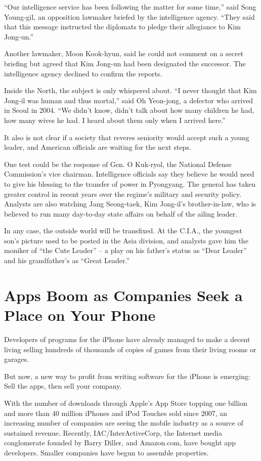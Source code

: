 \documentclass[12pt,a4paper,onecolumn]{article}
\begin{document}
``Our intelligence service has been following the matter for some time,'' said Song Young-gil, an
opposition lawmaker briefed by the intelligence agency. ``They said that this message instructed the
diplomats to pledge their allegiance to Kim Jong-un.''

Another lawmaker, Moon Kook-hyun, said he could not comment on a secret briefing but agreed that Kim
Jong-un had been designated the successor. The intelligence agency declined to confirm the reports.

Inside the North, the subject is only whispered about. ``I never thought that Kim Jong-il was human
and thus mortal,'' said Oh Yeon-jong, a defector who arrived in Seoul in 2004. ``We didn't know,
didn't talk about how many children he had, how many wives he had. I heard about them only when I
arrived here.''

It also is not clear if a society that reveres seniority would accept such a young leader, and
American officials are waiting for the next steps.

One test could be the response of Gen. O Kuk-ryol, the National Defense Commission's vice chairman.
Intelligence officials say they believe he would need to give his blessing to the transfer of power
in Pyongyang. The general has taken greater control in recent years over the regime's military and
security policy. Analysts are also watching Jang Seong-taek, Kim Jong-il's brother-in-law, who is
believed to run many day-to-day state affairs on behalf of the ailing leader.

In any case, the outside world will be transfixed. At the C.I.A., the youngest son's picture used to
be posted in the Asia division, and analysts gave him the moniker of ``the Cute Leader'' -- a play
on his father's status as ``Dear Leader'' and his grandfather's as ``Great Leader.''

\section{Apps Boom as Companies Seek a Place on Your Phone}

Developers of programs for the iPhone have already managed to make a decent living selling hundreds
of thousands of copies of games from their living rooms or garages.

But now, a new way to profit from writing software for the iPhone is emerging: Sell the apps, then
sell your company.

With the number of downloads through Apple's App Store topping one billion and more than 40 million
iPhones and iPod Touches sold since 2007, an increasing number of companies are seeing the mobile
industry as a source of sustained revenue. Recently, IAC/InterActiveCorp, the Internet media
conglomerate founded by Barry Diller, and Amazon.com, have bought app developers. Smaller companies
have begun to assemble properties.
\end{document}
